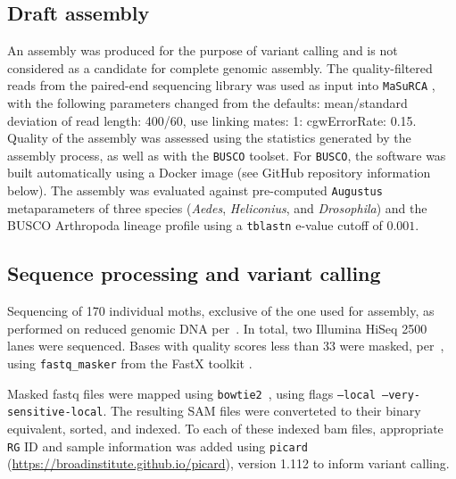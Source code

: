 \documentclass[fleqn,11pt]{wlpeerj}
\begin{document}
\subsection*{Draft assembly}

An assembly was produced for the purpose of variant calling and is not
considered as a candidate for complete genomic assembly. The quality-filtered
reads from the paired-end sequencing library was used as input into
\texttt{MaSuRCA} \citep[][version 2.3.2]{Zimin:2013kn}, with the following
parameters changed from the defaults: mean/standard deviation of read length:
400/60, use linking mates: 1: cgwErrorRate: 0.15.  Quality of the assembly was
assessed using the statistics generated by the assembly process, as well as with the
\texttt{BUSCO} \citep[][version 1.1b1]{Simao:2015kk} toolset. For
\texttt{BUSCO}, the software was built automatically using a Docker image (see
GitHub repository information below). The assembly was evaluated against
pre-computed \texttt{Augustus} \citep{Stanke:2003eo} metaparameters of  three
species (\textit{Aedes}, \textit{Heliconius}, and \textit{Drosophila}) and the
BUSCO Arthropoda lineage profile using a \texttt{tblastn} e-value cutoff of
$0.001$.

\subsection*{Sequence processing and variant calling} Sequencing of 170
individual moths, exclusive of the one used for assembly,  as performed on
reduced genomic DNA per~\cite{PARCHMAN:2012ca}. In total, two  Illumina HiSeq
2500 lanes were sequenced. Bases with quality scores less than 33 were masked,
per~\cite{Yun:2014dn},  using \texttt{fastq\_masker} from the FastX toolkit
\citep[][version 0.0.14]{citeulike:9103573}.

Masked fastq files were mapped using \texttt{bowtie2}~\citep[][version
2.2.4]{Langmead:2012jh}, using flags  \texttt{--local
--very-sensitive-local}.  The resulting  SAM files were converteted to their
binary equivalent, sorted, and indexed. To each of these indexed bam files,
appropriate \texttt{RG} ID and sample information was added using
\texttt{picard} \\ (\url{https://broadinstitute.github.io/picard}), version 1.112
to inform variant calling.
\end{document}
